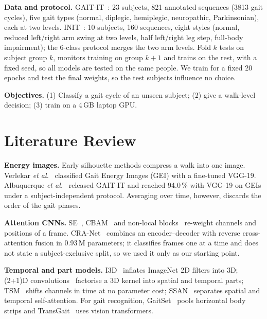 \documentclass[conference]{IEEEtran}
\begin{document}
\textbf{Data and protocol.} GAIT-IT~\cite{albuquerque2021}: 23 subjects, 821
annotated sequences (3813 gait cycles), five gait types (normal, diplegic, hemiplegic, neuropathic,
Parkinsonian), each at two levels. INIT~\cite{ortells2018}: 10 subjects, 160
sequences, eight styles (normal, reduced left/right arm swing at two levels,
half left/right leg step, full-body impairment); the 6-class protocol merges
the two arm levels. Fold $k$ tests on subject group $k$, monitors training on
group $k{+}1$ and trains on the rest, with a fixed seed, so all models are
tested on the same people. We train for a fixed 20 epochs and test the final
weights, so the test subjects influence no choice.

\textbf{Objectives.} (1) Classify a gait cycle of an unseen subject; (2) give a
walk-level decision; (3) train on a 4\,GB laptop GPU.

\section{Literature Review}
\textbf{Energy images.} Early silhouette methods compress a walk into one image.
Verlekar \emph{et al.}~\cite{verlekar2018} classified Gait Energy Images (GEI)
with a fine-tuned VGG-19. Albuquerque \emph{et al.}~\cite{albuquerque2021}
released GAIT-IT and reached 94.0\,\% with VGG-19 on GEIs under a
subject-independent protocol. Averaging over time, however, discards the order
of the gait phases.

\textbf{Attention CNNs.} SE~\cite{hu2018se}, CBAM~\cite{woo2018cbam} and
non-local blocks~\cite{wang2018nonlocal} re-weight channels and positions of a
frame. CRA-Net~\cite{bodepu_cranet} combines an encoder--decoder with reverse
cross-attention fusion in 0.93\,M parameters; it classifies frames one at a
time and does not state a subject-exclusive split, so we used it only as our
starting point.

\textbf{Temporal and part models.} I3D~\cite{carreira2017i3d} inflates
ImageNet 2D filters into 3D; (2+1)D convolutions~\cite{tran2018r21d} factorise a
3D kernel into spatial and temporal parts; TSM~\cite{lin2019tsm} shifts channels
in time at no parameter cost; SSAN~\cite{guo2021ssan} separates spatial and
temporal self-attention. For gait recognition, GaitSet~\cite{chao2019gaitset}
pools horizontal body strips and TransGait~\cite{li2023transgait} uses vision
transformers.
\end{document}

